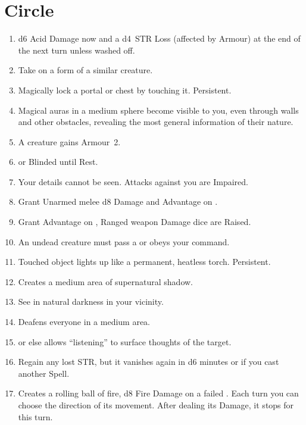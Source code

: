 \documentclass[itdr/core]{subfiles}
\begin{document}

\vfill
\break

\section{ Circle}
\def \spellcircle {2}
\begin{enumerate}
	\item {} d6 Acid Damage now and a d4~STR Loss (affected by Armour) at the end of the next turn unless washed off.
	\item {} Take on a form of a similar creature.
	\item {} Magically lock a portal or chest by touching it. Persistent.
	\item {} Magical auras in a medium sphere become visible to you, even through walls and other obstacles, revealing the most general information of their nature.
	\item {} A creature gains Armour~2.
	\item {}  or Blinded until Rest.
	\item {} Your details cannot be seen. Attacks against you are Impaired.
	\item {} Grant Unarmed melee d8 Damage and Advantage on .
	\item {} Grant Advantage on , Ranged weapon Damage dice are Raised.
	\item {} An undead creature must pass a  or obeys your command.
	\item {} Touched object lights up like a permanent, heatless torch. Persistent.
	\item {} Creates a medium area of supernatural shadow.
	\item {} See in natural darkness in your vicinity.
	\item {} Deafens everyone in a medium area.
	\item {}  or else allows \mbox{``listening''} to surface thoughts of the target.
	\item {} Regain any lost STR, but it vanishes again in d6 minutes or if you cast another Spell.
	\item {} Creates a rolling ball of fire, d8 Fire Damage on a failed . Each turn you can choose the direction of its movement. After dealing its Damage, it stops for this turn.

\end{enumerate}
\end{document}
